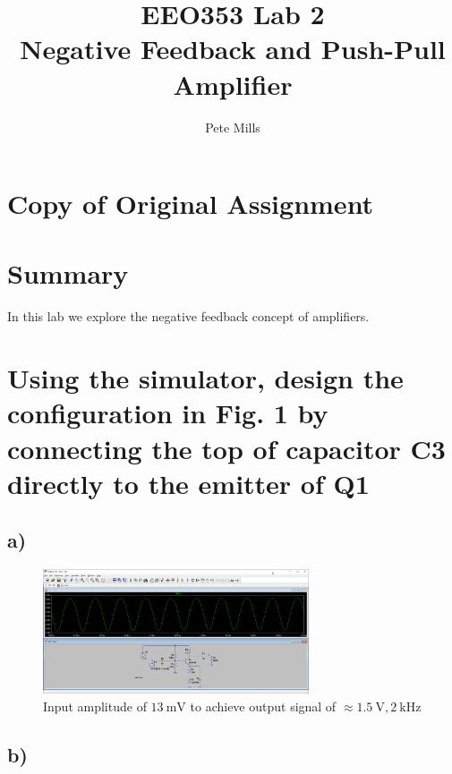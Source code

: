 \documentclass{article}
\begin{document}
	
	
	\title{EEO353 Lab 2\\ Negative Feedback and Push-Pull Amplifier}
	\author{Pete Mills}
	
	\maketitle
	
	\section*{Copy of Original Assignment}
	
	
	
	
	\section*{Summary}
	
	In this lab we explore the negative feedback concept of amplifiers.
	

	\section{Using the simulator, design the configuration in Fig. 1 by connecting the top of capacitor C3 directly to the emitter of Q1}
	
	\subsection*{a)}

	\begin{figure}[H]
	    \centering
	    \includegraphics[width=0.7\textwidth]{1a}
	    \caption{Input amplitude of $\SI{13}{\milli\volt}$ to achieve output signal of $\approx \SI{1.5}{\volt}, \SI{2}{\kilo\hertz}$}
	\end{figure}
	
	\subsection*{b)}
	
\end{document}
